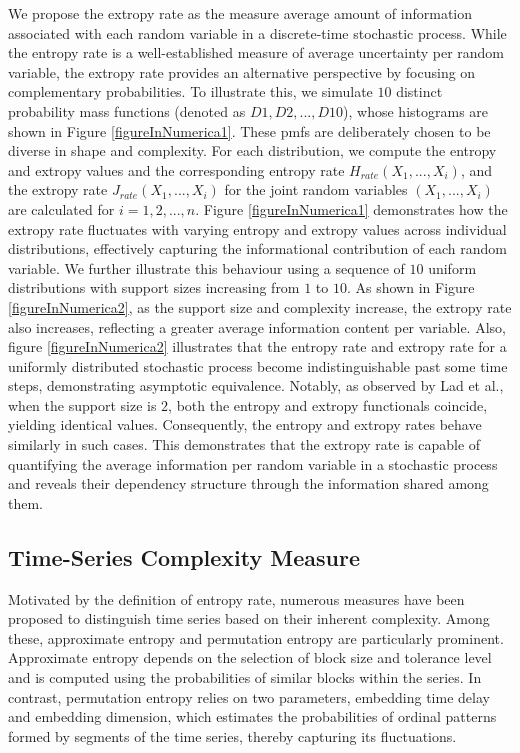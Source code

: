 \documentclass[pdflatex]{sn-jnl}%
\theoremstyle{thmstyleone}
\theoremstyle{thmstyletwo}%
\theoremstyle{thmstylethree}%
\begin{document}
We propose the extropy rate as the measure average amount of information associated with each random variable in a discrete-time stochastic process. While the entropy rate\cite{cover1999elements} is a well-established measure of average uncertainty per random variable, the extropy rate provides an alternative perspective by focusing on complementary probabilities. To illustrate this, we simulate $10$ distinct probability mass functions (denoted as $D1, D2,...,D10$), whose histograms are shown in Figure \ref{figureInNumerica1}. These pmfs are deliberately chosen to be diverse in shape and complexity. For each distribution, we compute the entropy and extropy values and the corresponding entropy rate $H_{rate}(X_1, ..., X_i)$, and the extropy rate $J_{rate}(X_1, ..., X_i)$ for the joint random variables $(X_1, ..., X_i)$ are calculated for $i = 1, 2, ..., n$. Figure \ref{figureInNumerica1} demonstrates how the extropy rate fluctuates with varying entropy and extropy values across individual distributions, effectively capturing the informational contribution of each random variable. We further illustrate this behaviour using a sequence of $10$ uniform distributions with support sizes increasing from $1$ to $10$. As shown in Figure \ref{figureInNumerica2}, as the support size and complexity increase, the extropy rate also increases, reflecting a greater average information content per variable. Also, figure \ref{figureInNumerica2} illustrates that the entropy rate and extropy rate for a uniformly distributed stochastic process become indistinguishable past some time steps, demonstrating asymptotic equivalence. Notably, as observed by Lad et al.\cite{lad2015extropy}, when the support size is $2$, both the entropy and extropy functionals coincide, yielding identical values. Consequently, the entropy and extropy rates behave similarly in such cases. This demonstrates that the extropy rate is capable of quantifying the average information per random variable in a stochastic process and reveals their dependency structure through the information shared among them.



\subsection{Time-Series Complexity Measure}
Motivated by the definition of entropy rate, numerous measures have been proposed to distinguish time series based on their inherent complexity. Among these, approximate entropy and permutation entropy are particularly prominent. Approximate entropy\cite{delgado2019approximate}
depends on the selection of block size and tolerance level and is computed using the probabilities of similar blocks within the series. In contrast, permutation entropy\cite{bandt2002permutation} relies on two parameters, embedding time delay and embedding dimension, which estimates the probabilities of ordinal patterns formed by segments of the time series, thereby capturing its fluctuations.
\end{document}
